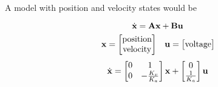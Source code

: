 A model with position and velocity states would be
\begin{theorem}
  \begin{equation*}
    \dot{\mathbf{x}} = \mathbf{A}\mathbf{x} + \mathbf{B}\mathbf{u}
  \end{equation*}
  \begin{equation*}
    \begin{array}{cc}
    \mathbf{x} =
      \begin{bmatrix}
        \text{position} \\
        \text{velocity}
      \end{bmatrix} &
    \mathbf{u} =
      \begin{bmatrix}
        \text{voltage}
      \end{bmatrix}
    \end{array}
  \end{equation*}
  \begin{equation}
    \dot{\mathbf{x}} =
      \begin{bmatrix}
        0 & 1 \\
        0 & -\frac{K_v}{K_a}
      \end{bmatrix}
      \mathbf{x} +
      \begin{bmatrix}
        0 \\
        \frac{1}{K_a}
      \end{bmatrix}
      \mathbf{u}
  \end{equation}
\end{theorem}
